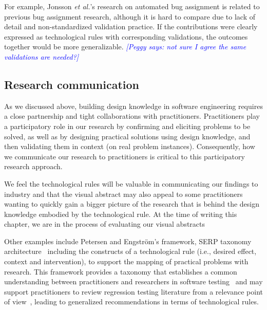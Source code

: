 \documentclass[graybox]{svmult}
\newcommand{\peggy}[1]{\textcolor{blue}{{\it [Peggy says: #1]}}}
\newcommand{\peggy}[1]{}
\begin{document}
For example, Jonsson \emph{et al.}'s research on automated bug assignment is related to previous bug assignment research, although it is hard to compare due to lack of detail and non-standardized validation practice. If the contributions were clearly expressed as technological rules with corresponding validations, the outcomes together would be more generalizable. 
\peggy{not sure I agree the same validations are needed?}

\subsection{Research communication}
\label{sec:communication}

As we discussed above, building design knowledge in software engineering requires a close partnership and tight collaborations with practitioners. 
Practitioners play a participatory role in our research by confirming and eliciting problems to be solved, as well as by designing practical solutions using design knowledge, and then validating them in context (on real problem instances). 
Consequently, how we communicate our research to practitioners is critical to this participatory research approach. 

We feel the technological rules will be valuable in communicating our findings to industry and that the visual abstract may also appeal to some practitioners wanting to quickly gain a bigger picture of the research that is behind the design knowledge embodied by the technological rule. 
At the time of writing this chapter, we are in the process of evaluating our visual abstracts

Other examples include Petersen and Engstr\"om's framework, SERP taxonomy architecture~\cite{petersen_finding_2014} including the constructs of a technological rule  
(i.e., desired effect, context and intervention), to support the mapping of practical problems with research. 
This framework provides a taxonomy that establishes a common understanding between practitioners and researchers in software testing~\cite{engstrom_SERP-test_2017} and may support practitioners to review regression testing literature from a relevance point of view~\cite{ali_search_2019}, leading to generalized recommendations in terms of technological rules. 
\end{document}
